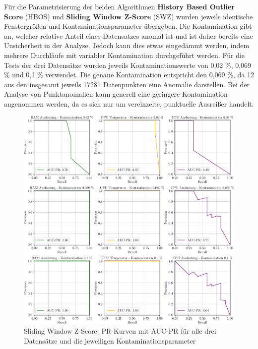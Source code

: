 Für die Parametrisierung der beiden Algorithmen \textbf{History Based Outlier Score} (HBOS) und \textbf{Sliding Window Z-Score} (SWZ) wurden
jeweils identische Fenstergrößen und Kontaminationsparameter übergeben. Die Kontamination gibt an, welcher relative Anteil eines Datensatzes
anomal ist und ist daher bereits eine Unsicherheit in der Analyse. Jedoch kann dies etwas eingedämmt werden, indem mehrere Durchläufe mit
variabler Kontamination durchgeführt werden. Für die Tests der drei Datensätze wurden jeweils Kontaminationswerte von 0,02 \%, 0,069 \% und
0,1 \% verwendet. Die genaue Kontamination entspricht den 0,069 \%, da 12 aus den insgesamt jeweils 17281 Datenpunkten eine Anomalie
darstellen. Bei der Analyse von Punktanomalien kann generell eine geringere Kontamination angenommen werden, da es sich nur um vereinzelte,
punktuelle Ausreißer handelt.

\begin{figure}[b!]
    \centering
        \includegraphics[width=1\linewidth]{ch5_anomalieerkennung/abbildungen/SWZ_AUC_PR.pdf}
    \caption{\centering Sliding Window Z-Score: PR-Kurven mit AUC-PR für alle drei Datensätze und die jeweiligen Kontaminationsparameter}
    \label{fig:hbos_auc_pr}
\end{figure}

